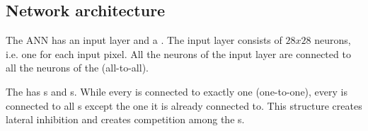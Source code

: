 \subsection{Network architecture}
\label{subsec:architecture}


The \ac{ANN} has an input layer and a \pLayer{}.
The input layer consists of $28 x 28$ neurons, i.e. one for each input pixel.
All the neurons of the input layer are connected to all the neurons of the \pLayer{} (all-to-all).

The \pLayer{} has \eN{}s and \iN{}s.
While every \eN{} is connected to exactly one \iN{} (one-to-one), every \iN{} is connected to all \eN{}s except the one it is already connected to.
This structure creates lateral inhibition and creates competition among the \eN{}s.